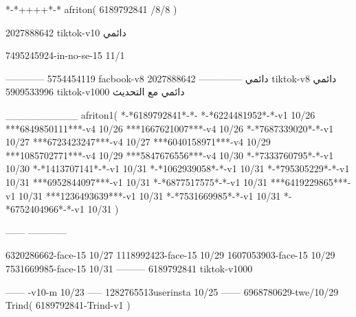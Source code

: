 *-*++++*-*
afriton(
6189792841 /8/8
)

2027888642 tiktok-v10
دائمي


7495245924-in-no-se-15 11/1

------------
5754454119 facbook-v8
دائمي
--------------
2027888642 tiktok-v8
دائمي
5909533996 tiktok-v1000
دائمي مع التحديث

__________
afriton1(
*-*6189792841*-*-
*-*6224481952*-*-v1 10/26
***6849850111***-v4 10/26
***1667621007***-v4 10/26
*-*7687339020*-*-v1 10/27
***6723423247***-v4 10/27
***6040158971***-v4 10/29
***1085702771***-v4 10/29
***5847676556***-v4 10/30
*-*7333760795*-*-v1 10/30
*-*1413707141*-*-v1 10/31
*-*1062939058*-*-v1 10/31
*-*795305229*-*-v1 10/31
***6952844097***-v1 10/31
*-*6877517575*-*-v1 10/31
***6419229865***-v1 10/31
***1236493639***-v1 10/31
*-*7531669985*-*-v1 10/31
*-*6752404966*-*-v1 10/31
)

------
------------


6320286662-face-15 10/27
1118992423-face-15 10/29
1607053903-face-15 10/29
7531669985-face-15 10/31
---------
6189792841 tiktok-v1000

------
-v10-m 10/23
-----
1282765513userinsta 10/25
------
6968780629-twe/10/29
Trind(
6189792841-Trind-v1 
)
